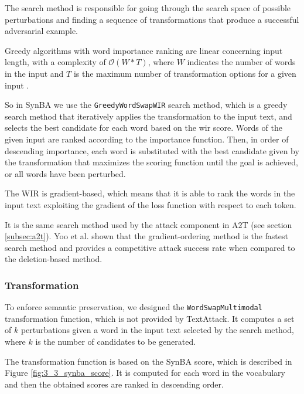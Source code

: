 The search method is responsible for going through the search space of possible perturbations and finding a sequence of transformations that produce a successful adversarial example.

Greedy algorithms with word importance ranking are linear concerning input length, with a complexity of $\mathcal{O}(W*T)$, where $W$ indicates the number of words in the input and $T$ is the maximum number of transformation options for a given input \cite{journals/corr/abs-2009-06368}. 

So in SynBA we use the \texttt{GreedyWordSwapWIR} search method, which is a greedy search method that iteratively applies the transformation to the input text, and selects the best candidate for each word based on the \acrfull{wir} score.
Words of the given input are ranked according to the importance function. Then, in order of descending importance, each word is substituted with the best candidate given by the transformation
that maximizes the scoring function until the goal is achieved, or all words have been perturbed.

The WIR is gradient-based, which means that it is able to rank the words in the input text exploiting the gradient of the loss function with respect to each token.

It is the same search method used by the attack component in A2T (see section \ref{subsec:a2t}).
Yoo et al. \cite{journals/corr/abs-2009-06368} shown that the gradient-ordering method is the fastest search method and provides a competitive attack success rate when compared to the deletion-based method.

\subsubsection{Transformation}\label{subsubsec:transformation}

To enforce semantic preservation, we designed the \texttt{WordSwapMultimodal} transformation function, which is not provided by TextAttack.
It computes a set of $k$ perturbations given a word in the input text selected by the search method, where $k$ is the number of candidates to be generated.

The transformation function is based on the SynBA score, which is described in Figure \ref{fig:3_3_synba_score}.
It is computed for each word in the vocabulary and then the obtained scores are ranked in descending order.

